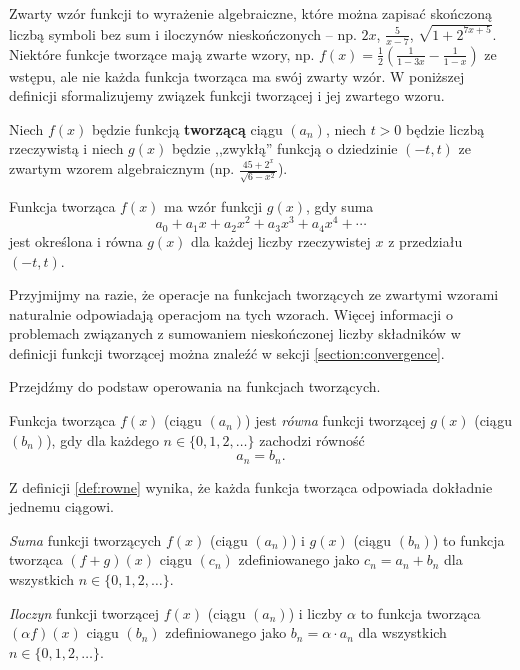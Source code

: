 \documentclass[shortabstract]{imthesis}
\begin{document}
Zwarty wzór funkcji to wyrażenie algebraiczne, które można zapisać skończoną liczbą symboli bez sum i iloczynów nieskończonych -- np. $2x$, $\frac{5}{x-7}$, $\sqrt{1+2^{7x+5}}$. Niektóre funkcje tworzące mają zwarte wzory, np. $f(x) = \frac12\left(\frac{1}{1-3x}-\frac{1}{1-x}\right)$ ze wstępu, ale nie każda funkcja tworząca ma swój zwarty wzór. W poniższej definicji sformalizujemy związek funkcji tworzącej i jej zwartego wzoru.

\begin{definition} \label{def:expr}
    Niech $f(x)$ będzie funkcją \textbf{tworzącą} ciągu $(a_n)$, niech $t > 0$ będzie liczbą rzeczywistą i niech $g(x)$ będzie ,,zwykłą'' funkcją o dziedzinie $(-t, t)$ ze zwartym wzorem algebraicznym (np. $\frac{45+2^x}{\sqrt{6-x^2}}$).
    
    Funkcja tworząca $f(x)$ ma wzór funkcji $g(x)$, gdy suma
    $$
    a_0 + a_1x + a_2x^2 + a_3x^3 + a_4x^4 + \cdots
    $$
    jest określona i równa $g(x)$ dla każdej liczby rzeczywistej $x$ z przedziału $(-t, t)$.
\end{definition}

Przyjmijmy na razie, że operacje na funkcjach tworzących ze zwartymi wzorami naturalnie odpowiadają operacjom na tych wzorach. Więcej informacji o problemach związanych z sumowaniem nieskończonej liczby składników w definicji funkcji tworzącej można znaleźć w sekcji \ref{section:convergence}. 

Przejdźmy do podstaw operowania na funkcjach tworzących.

\begin{definition} \label{def:rowne}
    Funkcja tworząca $f(x)$ (ciągu $(a_n)$) jest \emph{równa} funkcji tworzącej $g(x)$ (ciągu $(b_n)$), gdy dla każdego $n \in \{0, 1, 2, \ldots\}$ zachodzi równość
    $$
    a_n = b_n.
    $$
\end{definition}

\begin{corollary}
    Z definicji \ref{def:rowne} wynika, że każda funkcja tworząca odpowiada dokładnie jednemu ciągowi.
\end{corollary}

\begin{definition}
    \emph{Suma} funkcji tworzących $f(x)$ (ciągu $(a_n)$) i $g(x)$ (ciągu $(b_n)$) to funkcja tworząca $(f+g)(x)$ ciągu $(c_n)$ zdefiniowanego jako $c_n = a_n+b_n$ dla wszystkich $n \in \{0, 1, 2, \ldots\}$.
\end{definition}

\begin{definition}
    \emph{Iloczyn} funkcji tworzącej $f(x)$ (ciągu $(a_n)$) i liczby $\alpha$ to funkcja tworząca $(\alpha f)(x)$ ciągu $(b_n)$ zdefiniowanego jako $b_n = \alpha \cdot a_n$ dla wszystkich $n \in \{0, 1, 2, \ldots\}$.
\end{definition}
\end{document}
